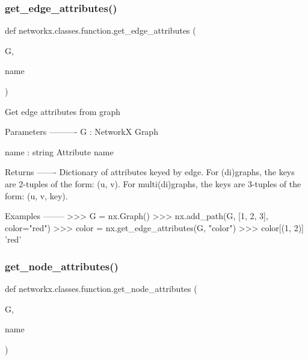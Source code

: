 \subsubsection{\texorpdfstring{get\+\_\+edge\+\_\+attributes()}{get\_edge\_attributes()}}
{\footnotesize\ttfamily def networkx.\+classes.\+function.\+get\+\_\+edge\+\_\+attributes (\begin{DoxyParamCaption}\item[{}]{G,  }\item[{}]{name }\end{DoxyParamCaption})}

\begin{DoxyVerb}Get edge attributes from graph

Parameters
----------
G : NetworkX Graph

name : string
   Attribute name

Returns
-------
Dictionary of attributes keyed by edge. For (di)graphs, the keys are
2-tuples of the form: (u, v). For multi(di)graphs, the keys are 3-tuples of
the form: (u, v, key).

Examples
--------
>>> G = nx.Graph()
>>> nx.add_path(G, [1, 2, 3], color="red")
>>> color = nx.get_edge_attributes(G, "color")
>>> color[(1, 2)]
'red'
\end{DoxyVerb}
 \mbox{\label{namespacenetworkx_1_1classes_1_1function_a084c24285aa0773cefca0807c62d2ee6}} 
\subsubsection{\texorpdfstring{get\+\_\+node\+\_\+attributes()}{get\_node\_attributes()}}
{\footnotesize\ttfamily def networkx.\+classes.\+function.\+get\+\_\+node\+\_\+attributes (\begin{DoxyParamCaption}\item[{}]{G,  }\item[{}]{name }\end{DoxyParamCaption})}

